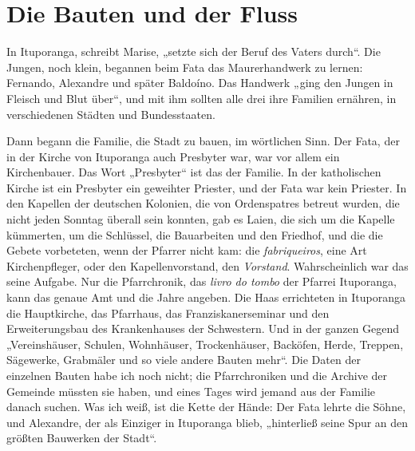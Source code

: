 \documentclass[
  ngerman,
  11pt,
  openany]{book}
\begin{document}
\section{Die Bauten und der Fluss}\label{die-bauten-und-der-fluss}

In Ituporanga, schreibt Marise, „setzte sich der Beruf des Vaters
durch``. Die Jungen, noch klein, begannen beim Fata das Maurerhandwerk
zu lernen: Fernando, Alexandre und später Baldoíno. Das Handwerk „ging
den Jungen in Fleisch und Blut über``, und mit ihm sollten alle drei
ihre Familien ernähren, in verschiedenen Städten und Bundesstaaten.

Dann begann die Familie, die Stadt zu bauen, im wörtlichen Sinn. Der
Fata, der in der Kirche von Ituporanga auch Presbyter war, war vor allem
ein Kirchenbauer. Das Wort „Presbyter`` ist das der Familie. In der
katholischen Kirche ist ein Presbyter ein geweihter Priester, und der
Fata war kein Priester. In den Kapellen der deutschen Kolonien, die von
Ordenspatres betreut wurden, die nicht jeden Sonntag überall sein
konnten, gab es Laien, die sich um die Kapelle kümmerten, um die
Schlüssel, die Bauarbeiten und den Friedhof, und die die Gebete
vorbeteten, wenn der Pfarrer nicht kam: die \emph{fabriqueiros}, eine
Art Kirchenpfleger, oder den Kapellenvorstand, den \emph{Vorstand}.
Wahrscheinlich war das seine Aufgabe. Nur die Pfarrchronik, das
\emph{livro do tombo} der Pfarrei Ituporanga, kann das genaue Amt und
die Jahre angeben. Die Haas errichteten in Ituporanga die Hauptkirche,
das Pfarrhaus, das Franziskanerseminar und den Erweiterungsbau des
Krankenhauses der Schwestern. Und in der ganzen Gegend „Vereinshäuser,
Schulen, Wohnhäuser, Trockenhäuser, Backöfen, Herde, Treppen, Sägewerke,
Grabmäler und so viele andere Bauten mehr``. Die Daten der einzelnen
Bauten habe ich noch nicht; die Pfarrchroniken und die Archive der
Gemeinde müssten sie haben, und eines Tages wird jemand aus der Familie
danach suchen. Was ich weiß, ist die Kette der Hände: Der Fata lehrte
die Söhne, und Alexandre, der als Einziger in Ituporanga blieb,
„hinterließ seine Spur an den größten Bauwerken der Stadt``.
\end{document}
